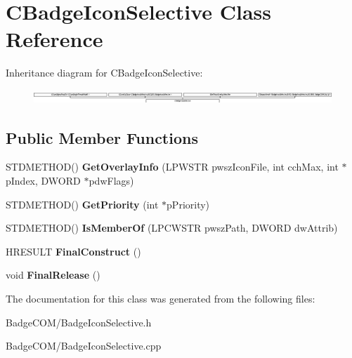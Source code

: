 \hypertarget{class_c_badge_icon_selective}{\section{C\-Badge\-Icon\-Selective Class Reference}
\label{class_c_badge_icon_selective}
}
Inheritance diagram for C\-Badge\-Icon\-Selective\-:\begin{figure}[H]
\begin{center}
\leavevmode
\includegraphics[height=0.520446cm]{class_c_badge_icon_selective}
\end{center}
\end{figure}
\subsection*{Public Member Functions}
\begin{DoxyCompactItemize}
\item 
\hypertarget{class_c_badge_icon_selective_ac659ed8d942151d37eec3bec6538359c}{S\-T\-D\-M\-E\-T\-H\-O\-D() {\bfseries Get\-Overlay\-Info} (L\-P\-W\-S\-T\-R pwsz\-Icon\-File, int cch\-Max, int $\ast$p\-Index, D\-W\-O\-R\-D $\ast$pdw\-Flags)}\label{class_c_badge_icon_selective_ac659ed8d942151d37eec3bec6538359c}

\item 
\hypertarget{class_c_badge_icon_selective_a2c387d713498a19488b4ef1f30a6023b}{S\-T\-D\-M\-E\-T\-H\-O\-D() {\bfseries Get\-Priority} (int $\ast$p\-Priority)}\label{class_c_badge_icon_selective_a2c387d713498a19488b4ef1f30a6023b}

\item 
\hypertarget{class_c_badge_icon_selective_a8e74313b208eee82293866641fdc298e}{S\-T\-D\-M\-E\-T\-H\-O\-D() {\bfseries Is\-Member\-Of} (L\-P\-C\-W\-S\-T\-R pwsz\-Path, D\-W\-O\-R\-D dw\-Attrib)}\label{class_c_badge_icon_selective_a8e74313b208eee82293866641fdc298e}

\item 
\hypertarget{class_c_badge_icon_selective_a40a36e3e95dba78ada437d849d9e1fb5}{H\-R\-E\-S\-U\-L\-T {\bfseries Final\-Construct} ()}\label{class_c_badge_icon_selective_a40a36e3e95dba78ada437d849d9e1fb5}

\item 
\hypertarget{class_c_badge_icon_selective_aa6479711494c8f5ee636a1e545867607}{void {\bfseries Final\-Release} ()}\label{class_c_badge_icon_selective_aa6479711494c8f5ee636a1e545867607}

\end{DoxyCompactItemize}


The documentation for this class was generated from the following files\-:\begin{DoxyCompactItemize}
\item 
Badge\-C\-O\-M/Badge\-Icon\-Selective.\-h\item 
Badge\-C\-O\-M/Badge\-Icon\-Selective.\-cpp\end{DoxyCompactItemize}
